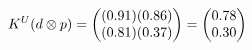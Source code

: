\documentclass[preview]{standalone}
\begin{document}
\begin{align*}
\special{dvisvgm:raw <g id='unique000'>}K^U(d \otimes p) = \begin{pmatrix} (0.91)(0.86) \\ (0.81)(0.37) \end{pmatrix} = \begin{pmatrix} 0.78 \\ 0.30 \end{pmatrix}\special{dvisvgm:raw </g>}
\end{align*}
\end{document}
